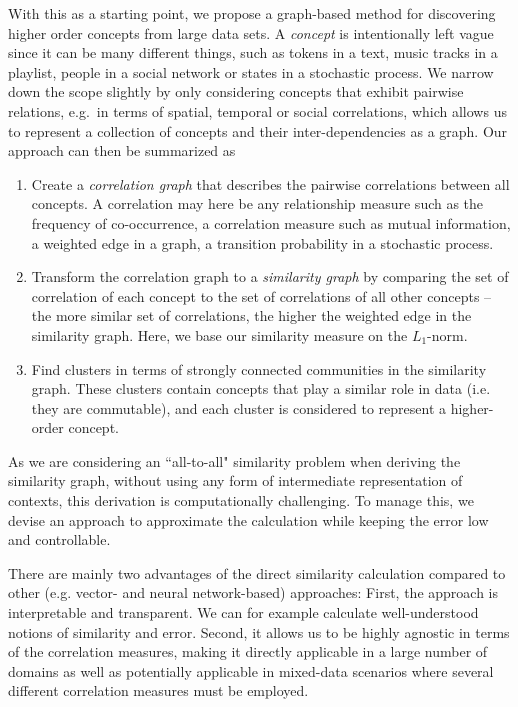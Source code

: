 \documentclass{sig-alternate}
\begin{document}
With this as a starting point, we propose a graph-based method for discovering higher order concepts from large data
sets. A \emph{concept} is intentionally left vague since it can be many different things, such as tokens in a text,
music tracks in a playlist, people in a social network or states in a stochastic process. We narrow down the scope
slightly by only considering concepts that exhibit pairwise relations, e.g.\ in terms of spatial, temporal or social
correlations, which allows us to represent a collection of concepts and their inter-dependencies as a graph. Our
approach can then be summarized as
\begin{enumerate}
\item Create a \emph{correlation graph} that describes the pairwise correlations between all concepts. A correlation may here be any relationship measure such as
the frequency of co-occurrence, a correlation measure such as mutual information, a weighted edge in a graph, a
transition probability in a stochastic process.
\item Transform the correlation graph to a \emph{similarity graph} by comparing the set of correlation of each concept
to the set of correlations of all other concepts -- the more similar set of correlations, the higher the weighted edge in the
similarity graph. Here, we base our similarity measure on the $L_1$-norm.
\item Find clusters in terms of strongly connected communities in the similarity graph. These clusters contain concepts
that play a similar role in data (i.e. they are commutable), and each cluster is considered to represent a higher-order
concept.
\end{enumerate} As we are considering an ``all-to-all" similarity problem when deriving the similarity graph, without
using any form of intermediate representation of contexts, this derivation is computationally challenging. To manage
this, we devise an approach to approximate the calculation while keeping the error low and controllable.

There are mainly two advantages of the direct similarity calculation compared to other (e.g. vector- and neural
network-based) approaches: First, the approach is interpretable and transparent. We can for example calculate
well-understood notions of similarity and error. Second, it allows us to be highly agnostic in terms of the correlation
measures, making it directly applicable in a large number of domains as well as potentially applicable
in mixed-data scenarios where several different correlation measures must be employed.
\end{document}
